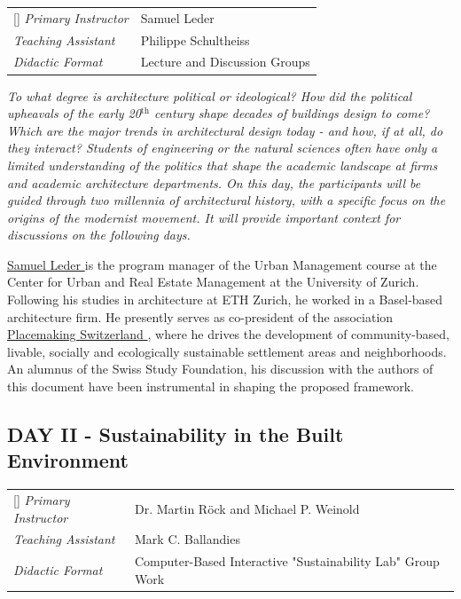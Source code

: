 \documentclass{article}
\begin{document}
\begin{NiceTabular}{W{l}{3cm}l}[]
\textit{Primary Instructor} & Samuel Leder \\
\textit{Teaching Assistant} & Philippe Schultheiss \\
\textit{Didactic Format} & Lecture and Discussion Groups
\end{NiceTabular}

\textit{To what degree is architecture political or ideological? How did the political upheavals of the early 20$^{\text{th}}$ century shape decades of buildings design to come? Which are the major trends in architectural design today - and how, if at all, do they interact? Students of engineering or the natural sciences often have only a limited understanding of the politics that shape the academic landscape at firms and academic architecture departments. On this day, the participants will be guided through two millennia of architectural history, with a specific focus on the origins of the modernist movement. It will provide important context for discussions on the following days.}

\href{https://www.linkedin.com/in/samuel-leder/}{Samuel Leder \ExternalLink} is the program manager of the Urban Management course at the Center for Urban and Real Estate Management at the University of Zurich. Following his studies in architecture at ETH Zurich, he worked in a Basel-based architecture firm. He presently serves as co-president of the association \href{https://www.placemaking-switzerland.ch}{Placemaking Switzerland \ExternalLink}, where he drives the development of  community-based, livable, socially and ecologically sustainable settlement areas and neighborhoods. An alumnus of the Swiss Study Foundation, his discussion with the authors of this document have been instrumental in shaping the proposed framework.

\subsection{DAY II - Sustainability in the Built Environment}

\begin{NiceTabular}{W{l}{3cm}l}[]
\textit{Primary Instructor} & Dr. Martin Röck and Michael P. Weinold \\
\textit{Teaching Assistant} & Mark C. Ballandies \\
\textit{Didactic Format} & Computer-Based Interactive "Sustainability Lab" Group Work
\end{NiceTabular}
\end{document}
